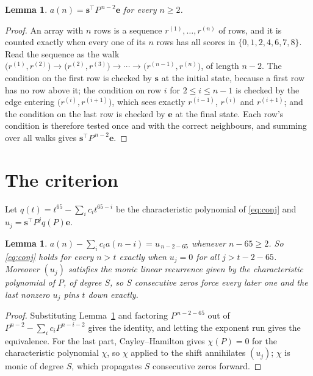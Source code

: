 \documentclass[11pt,a4paper]{article}
\theoremstyle{plain}
\newtheorem{lemma}[theorem]{Lemma}
\theoremstyle{definition}
\begin{document}
\begin{lemma}\label{lem:walk}
$a(n)=\mathbf{s}^{\!\top}P^{\,n-2}\mathbf{e}$ for every $n\ge2$.
\end{lemma}

\begin{proof}
An array with $n$ rows is a sequence $r^{(1)},\dots,r^{(n)}$ of rows, and it is counted
exactly when every one of its $n$ rows has all scores in $\{0,1,2,4,6,7,8\}$. Read the sequence as the
walk $\bigl(r^{(1)},r^{(2)}\bigr)\to\bigl(r^{(2)},r^{(3)}\bigr)\to\cdots\to
\bigl(r^{(n-1)},r^{(n)}\bigr)$, of length $n-2$. The condition on the first row is
checked by $\mathbf{s}$ at the initial state, because a first row has no row above it; the
condition on row $i$ for $2\le i\le n-1$ is checked by the edge entering
$\bigl(r^{(i)},r^{(i+1)}\bigr)$, which sees exactly $r^{(i-1)}$, $r^{(i)}$ and
$r^{(i+1)}$; and the condition on the last row is checked by $\mathbf{e}$ at the final
state. Each row's condition is therefore tested once and with the correct neighbours, and
summing over all walks gives $\mathbf{s}^{\!\top}P^{\,n-2}\mathbf{e}$.
\end{proof}

\section{The criterion}

Let $q(t)=t^{65}-\sum_i c_i t^{65-i}$ be the characteristic polynomial of
\eqref{eq:conj} and $u_j=\mathbf{s}^{\!\top}P^{j}q(P)\mathbf{e}$.

\begin{lemma}\label{lem:crit}
$a(n)-\sum_i c_i a(n-i)=u_{\,n-2-65}$ whenever $n-65\ge2$. So \eqref{eq:conj}
holds for every $n>t$ exactly when $u_j=0$ for all $j>t-2-65$. Moreover $(u_j)$
satisfies the monic linear recurrence given by the characteristic polynomial of $P$, of
degree $S$, so $S$ consecutive zeros force every later one and the last nonzero $u_j$ pins
$t$ down exactly.
\end{lemma}

\begin{proof}
Substituting Lemma~\ref{lem:walk} and factoring $P^{\,n-2-65}$ out of
$P^{n-2}-\sum_i c_i P^{n-i-2}$ gives the identity, and letting the exponent run gives the
equivalence. For the last part, Cayley--Hamilton gives $\chi(P)=0$ for the characteristic
polynomial $\chi$, so $\chi$ applied to the shift annihilates $(u_j)$; $\chi$ is monic of
degree $S$, which propagates $S$ consecutive zeros forward.
\end{proof}
\end{document}
